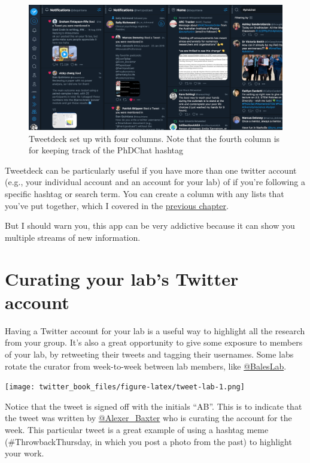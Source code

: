 \documentclass[
]{book}
\begin{document}
\begin{figure}

\includegraphics[width=0.8\linewidth]{images/tweetdeck} \hfill{}

\caption{Tweetdeck set up with four columns. Note that the fourth column is for keeping track of the PhDChat hashtag}\label{fig:unnamed-chunk-14}
\end{figure}

Tweetdeck can be particularly useful if you have more than one twitter account (e.g., your individual account and an account for your lab) of if you're following a specific hashtag or search term. You can create a column with any lists that you've put together, which I covered in the \protect\hyperlink{intermediate}{previous chapter}.

But I should warn you, this app can be very addictive because it can show you multiple streams of new information.

\hypertarget{curating-your-labs-twitter-account}{%
\section*{Curating your lab's Twitter account}\label{curating-your-labs-twitter-account}}

Having a Twitter account for your lab is a useful way to highlight all the research from your group. It's also a great opportunity to give some exposure to members of your lab, by retweeting their tweets and tagging their usernames. Some labs rotate the curator from week-to-week between lab members, like \href{https://twitter.com/BalesLab}{@BalesLab}.

\texttt{[image: twitter\_book\_files/figure-latex/tweet-lab-1.png]}

Notice that the tweet is signed off with the initials ``AB''. This is to indicate that the tweet was written by \href{https://twitter.com/Alexer_Baxter}{@Alexer\_Baxter} who is curating the account for the week. This particular tweet is a great example of using a hashtag meme (\#ThrowbackThursday, in which you post a photo from the past) to highlight your work.
\end{document}
